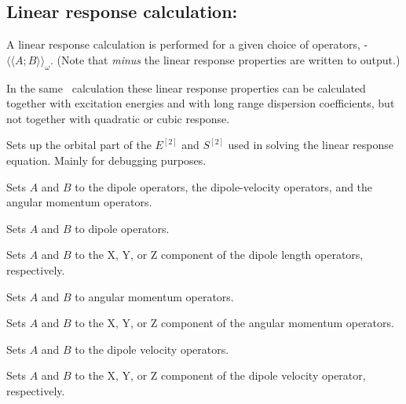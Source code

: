 \subsection{Linear response calculation: }
\label{sec:linearrsp}

A linear response
\cite{jodlypjjcp91,pjhjajjojcp89} calculation is performed for a given
choice of operators,
-$\langle\!\langle A; B \rangle\!\rangle_{\omega}$.
(Note that {\em minus} the linear response properties are written to output.)

In the same \resp\ calculation these linear response properties can be calculated
together with excitation energies
and with long range dispersion coefficients, but not
together with quadratic or cubic response.

\begin{description}

\item{} Sets up the orbital part of the $E^{\left[2\right]}$
  and $S^{\left[2\right]}$ used in solving the linear response
  equation. Mainly for debugging purposes.

\item{}
Sets $A$ and $B$ to the dipole operators,
the dipole-velocity operators,
and the angular momentum operators.

\item{}
Sets $A$ and $B$ to dipole operators.

\item{}
Sets $A$ and $B$ to the X, Y, or Z component of the dipole length operators, respectively.

\item{}
Sets $A$ and $B$ to angular momentum operators.

\item{}
Sets $A$ and $B$ to the X, Y, or Z component of the angular momentum operators.

\item{}
Sets $A$ and $B$ to the dipole velocity operators.

\item{}
Sets $A$ and $B$ to the X, Y, or Z component of the dipole velocity
operator, respectively.


\end{description}
